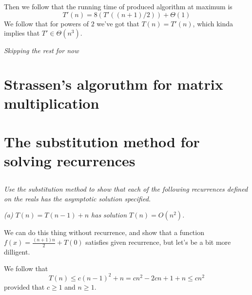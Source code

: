 \documentclass[11pt,oneside,titlepage]{book}
\begin{document}
Then we follow that the running time of produced algorithm at maximum is
$$T'(n) = 8 (T'((n + 1) / 2)) + \Theta(1)$$
We follow that for powers of $2$ we've got that $T(n) = T'(n)$, which kinda implies that
$T' \in \Theta(n^3)$.

\textit{Skipping the rest for now}

\section{Strassen's algoruthm for matrix multiplication}

\section{The substitution method for solving recurrences}

\subsection{}

\textit{Use the substitution method to show that each of the following recurrences defined
  on the reals has the asymptotic solution specified.}

\textit{(a) $T(n) = T(n - 1) + n$ has solution $T(n) = O(n^2)$.}

We can do this thing without recurrence, and show that a function $f(x) = \frac{(n + 1)n}{2} + T(0)$
satisfies given recurrence, but let's be a bit more dilligent.

We follow that
$$T(n) \leq c (n - 1)^2 + n = cn^2 - 2cn + 1 + n \leq cn^2$$
provided that $c \geq 1$ and $n \geq 1$. 
\end{document}
